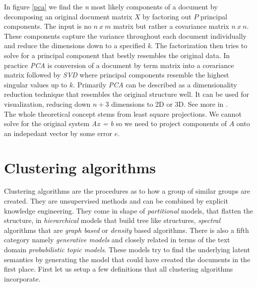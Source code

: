     In figure \ref{pca} we find the \emph{n} most likely components of a document by decomposing an original document matrix $X$ by factoring out $P$ principal components. The input is no $n\:x\:m$ matrix but rather a covariance matrix $n\:x\:n$. These components capture the variance throughout each document individually and reduce the dimensions down to a specified \emph{k}. The factorization then tries to solve for a principal component that bestly resembles the original data. In practice \emph{PCA} is conversion of a document by term matrix into a covariance matrix followed by \emph{SVD} where principal components resemble the highest singular values up to $k$. Primarily \emph{PCA} can be described as a dimensionality reduction technique that resembles the original structure well. It can be used for visualization, reducing down $n + 3$ dimensions to 2D or 3D. See more in \cite{PCA2009}.\\
    The whole theoretical concept stems from least square projections. We cannot solve for the original system \emph{Ax = b} so we need to project components of $A$ onto an indepedant vector by some error $e$. \cite[chp. 4]{Strang2009}

\section{Clustering algorithms}
  
  Clustering algorithms are the procedures as to how a group of similar groups are created. They are unsupervised methods and can be combined by explicit knowledge engineering. They come in shape of \emph{partitional} models, that flatten the structure, in \emph{hierarchical} models that build tree like structures, \emph{spectral} algorithms that are \emph{graph based} or \emph{density} based algorithms. There is also a fifth category namely \emph{generative models} and closely related in terms of the text domain \emph{probabilistic topic models}. These models try to find the underlying latent semantics by generating the model that could have created the documents in the first place. First let us setup a few definitions that all clustering algorithms incorporate.

